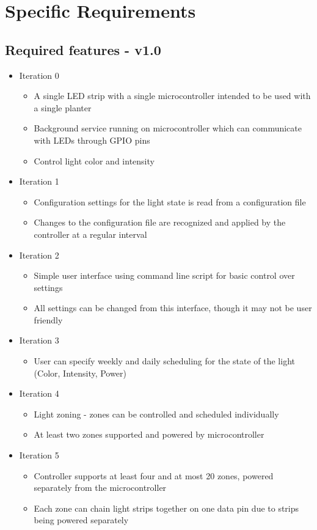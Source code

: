 \documentclass[onecolumn, draftclsnofoot,10pt, compsoc]{IEEEtran}
\begin{document}
	\section{Specific Requirements}
		\subsection{Required features - v1.0}
			\begin{itemize}
				\item Iteration 0
						\begin{itemize}
						\item A single LED strip with a single microcontroller intended to be used with a single planter
						\item Background service running on microcontroller which can communicate with LEDs through GPIO pins
						\item Control light color and intensity
					\end{itemize}
						\item Iteration 1
					\begin{itemize}
						\item Configuration settings for the light state is read from a configuration file
						\item Changes to the configuration file are recognized and applied by the controller at a regular interval
					\end{itemize}

				\item Iteration 2
					\begin{itemize}
						\item Simple user interface using command line script for basic control over settings
						\item All settings can be changed from this interface, though it may not be user friendly
					\end{itemize}
				\item Iteration 3
					\begin{itemize}
						\item User can specify weekly and daily scheduling for the state of the light (Color, Intensity, Power)
					\end{itemize}
				\item Iteration 4
					\begin{itemize}
						\item Light zoning - zones can be controlled and scheduled individually
						\item At least two zones supported and powered by microcontroller
					\end{itemize}
				\item Iteration 5
					\begin{itemize}
						\item Controller supports at least four and at most 20 zones, powered separately from the microcontroller
						\item Each zone can chain light strips together on one data pin due to strips being powered separately
					\end{itemize}
			\end{itemize}
\end{document}
